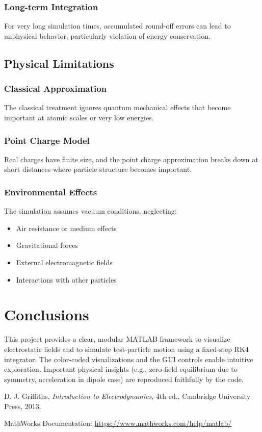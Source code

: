 \documentclass[12pt,a4paper]{article}
\begin{document}
\subsubsection{Long-term Integration} 
For very long simulation times, accumulated round-off errors can lead to unphysical behavior, particularly violation of energy conservation. 

\subsection{Physical Limitations} 

\subsubsection{Classical Approximation} 
The classical treatment ignores quantum mechanical effects that become important at atomic scales or very low energies. 

\subsubsection{Point Charge Model} 
Real charges have finite size, and the point charge approximation breaks down at short distances where particle structure becomes important. 

\subsubsection{Environmental Effects} 
The simulation assumes vacuum conditions, neglecting: 
\begin{itemize} 
    \item Air resistance or medium effects 
    \item Gravitational forces 
    \item External electromagnetic fields 
    \item Interactions with other particles 
\end{itemize}

\section{Conclusions}
This project provides a clear, modular MATLAB framework to visualize electrostatic fields and to simulate test-particle motion using a fixed-step RK4 integrator. The color-coded visualizations and the GUI controls enable intuitive exploration. Important physical insights (e.g., zero-field equilibrium due to symmetry, acceleration in dipole case) are reproduced faithfully by the code.

\begin{thebibliography}{99}
     D. J. Griffiths, \textit{Introduction to Electrodynamics}, 4th ed., Cambridge University Press, 2013.
    \item MathWorks Documentation: \url{https://www.mathworks.com/help/matlab/}
\end{thebibliography}
\end{document}
